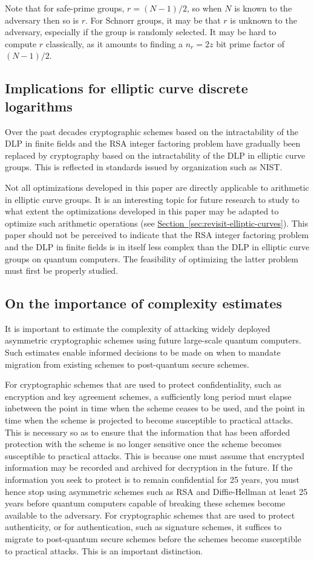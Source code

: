 \documentclass[superscriptaddress,notitlepage,longbibliography]{revtex4-1}
\theoremstyle{definition}
\theoremstyle{definition}
\renewcommand{\sec}[1]{\hyperref[sec:#1]{Section~\ref*{sec:#1}}}
\begin{document}
Note that for safe-prime groups, $r = (N-1)/2$, so when $N$ is known to the adversary then so is $r$. For Schnorr groups, it may be that $r$ is unknown to the adversary, especially if the group is randomly selected. It may be hard to compute $r$ classically, as it amounts to finding a $n_r = 2z$ bit prime factor of $(N-1)/2$.

\subsection{Implications for elliptic curve discrete logarithms}
Over the past decades cryptographic schemes based on the intractability of the DLP in finite fields and the RSA integer factoring problem have gradually been replaced by cryptography based on the intractability of the DLP in elliptic curve groups. This is reflected in standards issued by organization such as NIST.

Not all optimizations developed in this paper are directly applicable to arithmetic in elliptic curve groups. It is an interesting topic for future research to study to what extent the optimizations developed in this paper may be adapted to optimize such arithmetic operations (see \sec{revisit-elliptic-curves}). This paper should not be perceived to indicate that the RSA integer factoring problem and the DLP in finite fields is in itself less complex than the DLP in elliptic curve groups on quantum computers. The feasibility of optimizing the latter problem must first be properly studied.

\subsection{On the importance of complexity estimates}
It is important to estimate the complexity of attacking widely deployed asymmetric cryptographic schemes using future large-scale quantum computers. Such estimates enable informed decisions to be made on when to mandate migration from existing schemes to post-quantum secure schemes.

For cryptographic schemes that are used to protect confidentiality, such as encryption and key agreement schemes, a sufficiently long period must elapse inbetween the point in time when the scheme ceases to be used, and the point in time when the scheme is projected to become susceptible to practical attacks. This is necessary so as to ensure that the information that has been afforded protection with the scheme is no longer sensitive once the scheme becomes susceptible to practical attacks. This is because one must assume that encrypted information may be recorded and archived for decryption in the future. If the information you seek to protect is to remain confidential for 25 years, you must hence stop using asymmetric schemes such as RSA and Diffie-Hellman at least 25 years before quantum computers capable of breaking these schemes become available to the adversary. For cryptographic schemes that are used to protect authenticity, or for authentication, such as signature schemes, it suffices to migrate to post-quantum secure schemes before the schemes become susceptible to practical attacks. This is an important distinction.
\end{document}
